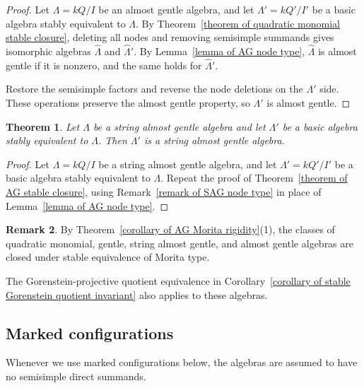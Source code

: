 \documentclass[11pt]{article}
\providecommand{\varLambda}{\Lambda}
\newtheorem{theorem}{Theorem}[section]
\theoremstyle{definition}
\newtheorem{remark}[theorem]{Remark}
\begin{document}
		\begin{proof}
			Let $\varLambda=kQ/I$ be an almost gentle algebra, and let $\varLambda'=kQ'/I'$ be a basic algebra stably equivalent to $\varLambda$.
			By Theorem~\ref{theorem of quadratic monomial stable closure}, deleting all nodes and removing semisimple summands gives isomorphic algebras $\widehat{\varLambda}$ and $\widehat{\varLambda}'$.
			By Lemma~\ref{lemma of AG node type}, $\widehat{\varLambda}$ is almost gentle if it is nonzero, and the same holds for $\widehat{\varLambda}'$.
		
			Restore the semisimple factors and reverse the node deletions on the $\varLambda'$ side.
			These operations preserve the almost gentle property, so $\varLambda'$ is almost gentle.
		\end{proof}

		\begin{theorem}\label{theorem of SAG stable closure}
			Let $\varLambda$ be a string almost gentle algebra and let $\varLambda'$ be a basic algebra stably equivalent to $\varLambda$.
			Then $\varLambda'$ is a string almost gentle algebra.
		\end{theorem}

		\begin{proof}
			Let $\varLambda=kQ/I$ be a string almost gentle algebra, and let $\varLambda'=kQ'/I'$ be a basic algebra stably equivalent to $\varLambda$.
			Repeat the proof of Theorem~\ref{theorem of AG stable closure}, using Remark~\ref{remark of SAG node type} in place of Lemma~\ref{lemma of AG node type}.
		\end{proof}


		\begin{remark}\label{remark of Morita type closure}
			By Theorem~\ref{corollary of AG Morita rigidity}(1), the classes of quadratic monomial, gentle, string almost gentle, and almost gentle algebras are closed under stable equivalence of Morita type.
		\end{remark}


		The Gorenstein-projective quotient equivalence in Corollary~\ref{corollary of stable Gorenstein quotient invariant} also applies to these algebras.



	\subsection{Marked configurations}

		Whenever we use marked configurations below, the algebras are assumed to have no semisimple direct summands.
\end{document}
